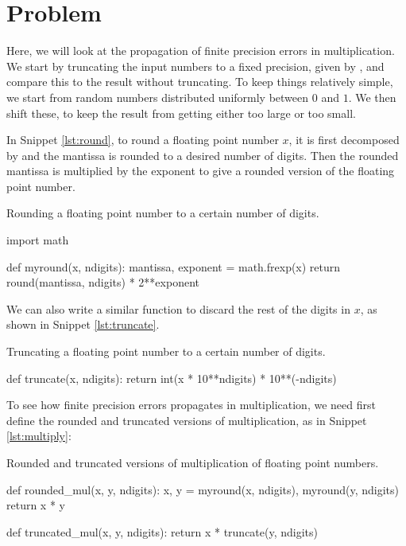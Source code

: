 \section{Problem \thesection}\label{sec:p1}

Here, we will look at the propagation of finite precision errors in
multiplication. We start by truncating the input numbers to a fixed precision, given by
, and compare this to the result without truncating. To keep things relatively simple,
we start from random numbers distributed uniformly between $0$ and $1$. We then shift these,
to keep the result from getting either too large or too small.

In Snippet \ref{lst:round}, to round a floating point number $x$, it is first decomposed by
 and the mantissa is rounded to a desired number of digits. Then the
rounded mantissa is multiplied by the exponent to give a rounded version of the floating
point number.

\begin{algorithm}
    \caption{Rounding a floating point number to a certain number of digits.}
    \label{lst:round}
    \begin{pythoncode}
        import math


        def myround(x, ndigits):
            mantissa, exponent = math.frexp(x)
            return round(mantissa, ndigits) * 2**exponent
    \end{pythoncode}
\end{algorithm}

We can also write a similar  function to discard the rest of the digits
in $x$, as shown in Snippet \ref{lst:truncate}.

\begin{algorithm}
    \caption{Truncating a floating point number to a certain number of digits.}
    \label{lst:truncate}
    \begin{pythoncode}
        def truncate(x, ndigits):
            return int(x * 10**ndigits) * 10**(-ndigits)
    \end{pythoncode}
\end{algorithm}

To see how finite precision errors propagates in multiplication, we need first define the
rounded and truncated versions of multiplication, as in Snippet \ref{lst:multiply}:

\begin{algorithm}
    \caption{Rounded and truncated versions of multiplication of floating point numbers.}
    \label{lst:multiply}
    \begin{pythoncode}
        def rounded_mul(x, y, ndigits):
            x, y = myround(x, ndigits), myround(y, ndigits)
            return x * y
        
        
        def truncated_mul(x, y, ndigits):
            return x * truncate(y, ndigits)
    \end{pythoncode}
\end{algorithm}

